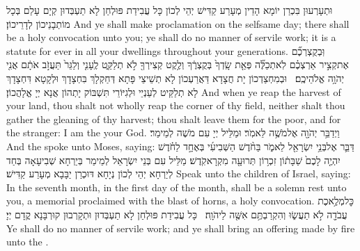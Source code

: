 {וּתְעָרְעוּן בִּכְרַן יוֹמָא הָדֵין מְעָרַע קַדִּישׁ יְהֵי לְכוֹן כָּל עֲבִידַת פּוּלְחַן לָא תַעְבְּדוּן קְיָם עָלַם בְּכָל מוֹתְבָנֵיכוֹן לְדָרֵיכוֹן׃}
{And ye shall make proclamation on the selfsame day; there shall be a holy convocation unto you; ye shall do no manner of servile work; it is a statute for ever in all your dwellings throughout your generations.}{}
{וּֽבְקֻצְרְכֶ֞ם אֶת\maqqaf קְצִ֣יר אַרְצְכֶ֗ם לֹֽא\maqqaf תְכַלֶּ֞ה פְּאַ֤ת שָֽׂדְךָ֙ בְּקֻצְרֶ֔ךָ וְלֶ֥קֶט קְצִירְךָ֖ לֹ֣א תְלַקֵּ֑ט לֶֽעָנִ֤י וְלַגֵּר֙ תַּעֲזֹ֣ב אֹתָ֔ם אֲנִ֖י יְהֹוָ֥ה אֱלֹהֵיכֶֽם׃ \petucha }
{וּבְמִחְצַדְכוֹן יָת חֲצָדָא דַּאֲרַעְכוֹן לָא תְשֵׁיצֵי פָּתָא דְּחַקְלָךְ בִּחְצָדָךְ וּלְקָטָא דִּחְצָדָךְ לָא תְלַקֵּיט לְעַנְיֵי וּלְגִיּוֹרֵי תִּשְׁבּוֹק יָתְהוֹן אֲנָא יְיָ אֱלָהֲכוֹן׃}
{And when ye reap the harvest of your land, thou shalt not wholly reap the corner of thy field, neither shalt thou gather the gleaning of thy harvest; thou shalt leave them for the poor, and for the stranger: I am the \lord\space your God.}{}
{וַיְדַבֵּ֥ר יְהֹוָ֖ה אֶל\maqqaf מֹשֶׁ֥ה לֵּאמֹֽר׃}
{וּמַלֵּיל יְיָ עִם מֹשֶׁה לְמֵימַר׃}
{And the \lord\space spoke unto Moses, saying:}{}
{דַּבֵּ֛ר אֶל\maqqaf בְּנֵ֥י יִשְׂרָאֵ֖ל לֵאמֹ֑ר בַּחֹ֨דֶשׁ הַשְּׁבִיעִ֜י בְּאֶחָ֣ד לַחֹ֗דֶשׁ יִהְיֶ֤ה לָכֶם֙ שַׁבָּת֔וֹן זִכְר֥וֹן תְּרוּעָ֖ה מִקְרָא\maqqaf קֹֽדֶשׁ׃}
{מַלֵּיל עִם בְּנֵי יִשְׂרָאֵל לְמֵימַר בְּיַרְחָא שְׁבִיעָאָה בְּחַד לְיַרְחָא יְהֵי לְכוֹן נְיָחָא דּוּכְרַן יַבָּבָא מְעָרַע קַדִּישׁ׃}
{Speak unto the children of Israel, saying: In the seventh month, in the first day of the month, shall be a solemn rest unto you, a memorial proclaimed with the blast of horns, a holy convocation.}{}
{כׇּל\maqqaf מְלֶ֥אכֶת עֲבֹדָ֖ה לֹ֣א תַעֲשׂ֑וּ וְהִקְרַבְתֶּ֥ם אִשֶּׁ֖ה לַיהֹוָֽה׃ \setuma }
{כָּל עֲבִידַת פּוּלְחַן לָא תַעְבְּדוּן וּתְקָרְבוּן קוּרְבָּנָא קֳדָם יְיָ׃}
{Ye shall do no manner of servile work; and ye shall bring an offering made by fire unto the \lord.}{}
